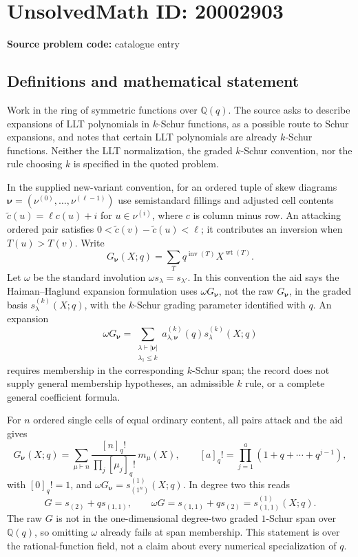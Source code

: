 \documentclass[11pt]{article}
\newcommand{\Q}{\mathbb{Q}}
\begin{document}
\section*{UnsolvedMath ID: 20002903}
\textbf{Source problem code:} catalogue entry
\subsection{Definitions and mathematical statement}
Work in the ring of symmetric functions over $\Q(q)$. The source asks to describe expansions of LLT polynomials in $k$-Schur functions, as a possible route to Schur expansions, and notes that certain LLT polynomials are already $k$-Schur functions. Neither the LLT normalization, the graded $k$-Schur convention, nor the rule choosing $k$ is specified in the quoted problem.

In the supplied new-variant convention, for an ordered tuple of skew diagrams $\boldsymbol\nu=(\nu^{(0)},\ldots,\nu^{(\ell-1)})$ use semistandard fillings and adjusted cell contents $\widetilde c(u)=\ell c(u)+i$ for $u\in\nu^{(i)}$, where $c$ is column minus row. An attacking ordered pair satisfies $0<\widetilde c(v)-\widetilde c(u)<\ell$; it contributes an inversion when $T(u)>T(v)$. Write
\[
G_{\boldsymbol\nu}(X;q)=\sum_Tq^{\operatorname{inv}(T)}X^{\operatorname{wt}(T)}.
\]
Let $\omega$ be the standard involution $\omega s_\lambda=s_{\lambda'}$. In this convention the aid says the Haiman--Haglund expansion formulation uses $\omega G_{\boldsymbol\nu}$, not the raw $G_{\boldsymbol\nu}$, in the graded basis $s^{(k)}_\lambda(X;q)$, with the $k$-Schur grading parameter identified with $q$. An expansion
\[
\omega G_{\boldsymbol\nu}=\sum_{\substack{\lambda\vdash|\boldsymbol\nu|\\\lambda_1\leq k}}a^{(k)}_{\lambda,\boldsymbol\nu}(q)s^{(k)}_\lambda(X;q)
\]
requires membership in the corresponding $k$-Schur span; the record does not supply general membership hypotheses, an admissible $k$ rule, or a complete general coefficient formula.

For $n$ ordered single cells of equal ordinary content, all pairs attack and the aid gives
\[
G_{\boldsymbol\nu}(X;q)=\sum_{\mu\vdash n}\frac{[n]_q!}{\prod_j[\mu_j]_q!}\,m_\mu(X),
\qquad [a]_q!=\prod_{j=1}^a(1+q+\cdots+q^{j-1}),
\]
with $[0]_q!=1$, and $\omega G_{\boldsymbol\nu}=s^{(1)}_{(1^n)}(X;q)$. In degree two this reads
\[
G=s_{(2)}+q s_{(1,1)},\qquad
\omega G=s_{(1,1)}+q s_{(2)}=s^{(1)}_{(1,1)}(X;q).
\]
The raw $G$ is not in the one-dimensional degree-two graded $1$-Schur span over $\Q(q)$, so omitting $\omega$ already fails at span membership. This statement is over the rational-function field, not a claim about every numerical specialization of $q$.
\end{document}
